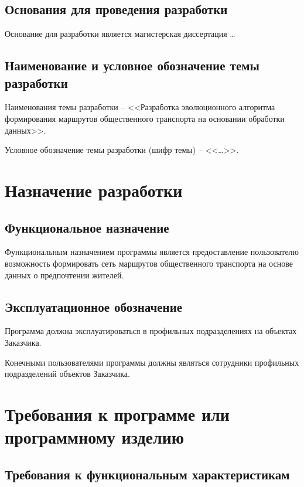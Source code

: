 \section{Основания для проведения разработки}
Основание для разработки является магистерская диссертация \ldots

\section{Наименование и условное обозначение темы разработки}
Наименования темы разработки -- <<Разработка эволюционного алгоритма формирования маршрутов общественного 
транспорта на основании обработки данных>>.

Условное обозначение темы разработки (шифр темы) -- <<\ldots>>.

\chapter{Назначение разработки}
\section{Функциональное назначение}
Функциональным назначением программы является предоставление пользователю возможность формировать сеть 
маршрутов общественного транспорта на основе данных о предпочтении жителей.

\section{Эксплуатационное обозначение}
Программа должна эксплуатироваться в профильных подразделениях на объектах Заказчика.

Конечными пользователями программы должны являться сотрудники профильных подразделений объектов Заказчика.

\chapter{Требования к программе или программному изделию}
\section{Требования к функциональным характеристикам}
% 
%

